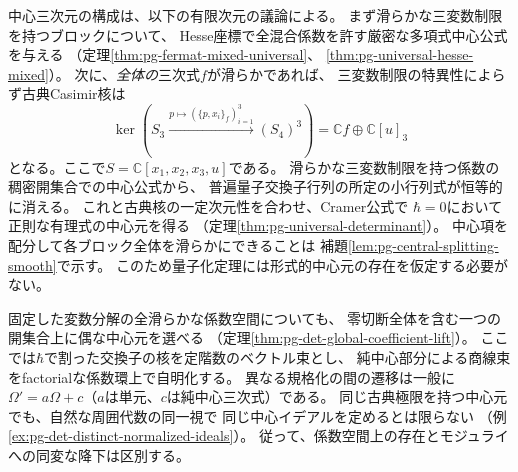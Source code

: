 中心三次元の構成は、以下の有限次元の議論による。
まず滑らかな三変数制限を持つブロックについて、
Hesse座標で全混合係数を許す厳密な多項式中心公式を与える
（定理\ref{thm:pg-fermat-mixed-universal}、
\ref{thm:pg-universal-hesse-mixed}）。
次に、\emph{全体の}三次式$f$が滑らかであれば、
三変数制限の特異性によらず古典Casimir核は
\begin{equation}\label{eq:intro-classical-kernel-all}
 \ker\left(S_3\xrightarrow{p\mapsto(\{p,x_i\}_f)_{i=1}^3}
 (S_4)^3\right)=\mathbb C f\oplus\mathbb C[u]_3
\end{equation}
となる。ここで$S=\mathbb C[x_1,x_2,x_3,u]$である。
滑らかな三変数制限を持つ係数の稠密開集合での中心公式から、
普遍量子交換子行列の所定の小行列式が恒等的に消える。
これと古典核の一定次元性を合わせ、Cramer公式で
$\hbar=0$において正則な有理式の中心元を得る
（定理\ref{thm:pg-universal-determinant}）。
中心項を配分して各ブロック全体を滑らかにできることは
補題\ref{lem:pg-central-splitting-smooth}で示す。
このため量子化定理には形式的中心元の存在を仮定する必要がない。

固定した変数分解の全滑らかな係数空間についても、
零切断全体を含む一つの開集合上に偶な中心元を選べる
（定理\ref{thm:pg-det-global-coefficient-lift}）。
ここでは$\hbar$で割った交換子の核を定階数のベクトル束とし、
純中心部分による商線束をfactorialな係数環上で自明化する。
異なる規格化の間の遷移は一般に
$\Omega'=a\Omega+c$（$a$は単元、$c$は純中心三次式）である。
同じ古典極限を持つ中心元でも、自然な周囲代数の同一視で
同じ中心イデアルを定めるとは限らない
（例\ref{ex:pg-det-distinct-normalized-ideals}）。
従って、係数空間上の存在とモジュライへの同変な降下は区別する。


